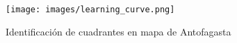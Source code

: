 \documentclass[12pt]{article}
\begin{document}
\begin{figure}[H]
    \centering
    \texttt{[image: images/learning\_curve.png]}
    \caption{Identificación de cuadrantes en mapa de Antofagasta}
    \label{fig:learning_curve}
\end{figure}











\printbibliography
\end{document}
